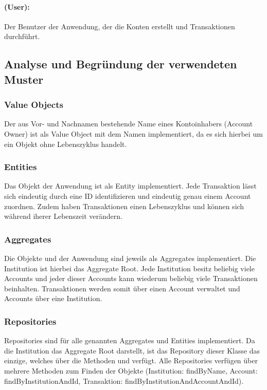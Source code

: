 \paragraph*{ (User):} Der Benutzer der Anwendung, der die Konten erstellt und Transaktionen durchführt.



\subsection{Analyse und Begründung der verwendeten Muster}
\label{chap:domainobj}
\subsubsection*{Value Objects}
Der aus Vor- und Nachnamen bestehende Name eines Kontoinhabers (Account Owner) ist als Value Object mit dem Namen  implementiert, da es sich hierbei um ein Objekt ohne Lebenszyklus handelt.
\subsubsection*{Entities}
Das Objekt  der Anwendung ist als Entity implementiert. Jede Transaktion lässt sich eindeutig durch eine ID identifizieren und eindeutig genau einem Account zuordnen. Zudem haben Transaktionen einen Lebenszyklus und können sich während iherer Lebenszeit verändern.
\subsubsection*{Aggregates}
Die Objekte  und  der Anwendung sind jeweils als Aggregates implementiert. Die Institution ist hierbei das Aggregate Root. Jede Institution besitz beliebig viele Accounts und jeder dieser Accounts kann wiederum beliebig viele Transaktionen beinhalten. Transaktionen werden somit über einen Account verwaltet und Accounts über eine Institution.
\subsubsection*{Repositories}
Repositories sind für alle genannten Aggregates und Entities implementiert. Da die Institution das Aggregate Root darstellt, ist das Repository dieser Klasse das einzige, welches über die Methoden  und  verfügt. Alle Repositories verfügen über mehrere Methoden zum Finden der Objekte (Institution: findByName, Account: findByInstitutionAndId, Transaktion: findByInstitutionAndAccountAndId). 
